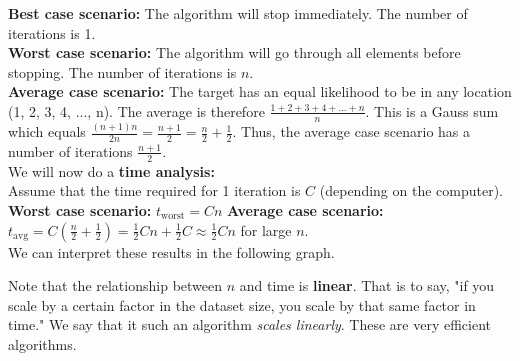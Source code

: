 \documentclass[]{article}
\begin{document}
\textbf{Best case scenario:} The algorithm will stop immediately. The number of iterations is 1.\\

\textbf{Worst case scenario:} The algorithm will go through all elements before stopping. The number of iterations is $n$.\\

\textbf{Average case scenario:} The target has an equal likelihood to be in any location (1, 2, 3, 4, ..., n). The average is therefore $\frac{1+2+3+4+...+n}{n}$. This is a Gauss sum which equals $\frac{(n+1)n}{2n} = \frac{n+1}{2} = \frac{n}{2} + \frac{1}{2}$. Thus, the average case scenario has a number of iterations $\frac{n+1}{2}$.\\


We will now do a \textbf{time analysis:}\\

Assume that the time required for 1 iteration is $C$ (depending on the computer).\\

\textbf{Worst case scenario:} $t_{\mathrm{worst}} = C n$
\textbf{Average case scenario:} $t_{\mathrm{avg}} = C (\frac{n}{2} + \frac{1}{2}) = \frac{1}{2}Cn + \frac{1}{2}C 
\approx \frac{1}{2}Cn$ for large $n$.\\


We can interpret these results in the following graph.\bigbreak

\begin{center}
\end{center}

Note that the relationship between $n$ and time is \textbf{linear}. That is to say, "if you scale by a certain factor in the dataset size, you scale by that same factor in time." We say that it such an algorithm \textit{scales linearly}. These are very efficient algorithms.\\
\end{document}
